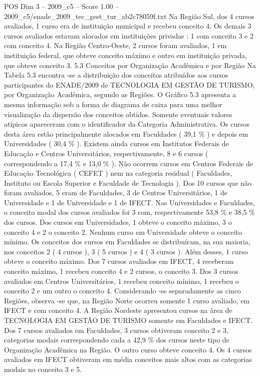 \begin{textsample}{POS Dim 3 – 2009\_c5 – Score 1.00 – 2009\_c5/enade\_2009\_tec\_gest\_tur\_ab2c78059f.txt}
Na Região Sul, dos 4 cursos avaliados, 1 curso era de instituição municipal e recebeu conceito 4.
Os demais 3 cursos avaliados estavam alocados em instituições privadas : 1 com conceito 3 e 2 com conceito 4.
Na Região Centro-Oeste, 2 cursos foram avaliados, 1 em instituição federal, que obteve conceito máximo e outro em instituição privada, que obteve conceito 3. 5.3 Conceitos por Organização Acadêmica e por Região Na Tabela 5.3 encontra -se a distribuição dos conceitos atribuídos aos cursos participantes do ENADE/2009 de TECNOLOGIA EM GESTÃO DE TURISMO, por Organização Acadêmica, segundo as Regiões.
O Gráfico 5.3 apresenta a mesma informação sob a forma de diagrama de caixa para uma melhor visualização da dispersão dos conceitos obtidos.
Somente eventuais valores atípicos apareceram com o identificador da Categoria Administrativa.
Os cursos desta área estão principalmente alocados em Faculdades ( 39,1 \% ) e depois em Universidades ( 30,4 \% ).
Existem ainda cursos em Institutos Federais de Educação e Centros Universitários, respectivamente, 8 e 6 cursos ( correspondendo a 17,4 \% e 13,0 \% ).
Não ocorrem cursos em Centros Federais de Educação Tecnológica ( CEFET ) nem na categoria residual ( Faculdades, Instituto ou Escola Superior e Faculdade de Tecnologia ).
Dos 10 cursos que não foram avaliados, 5 eram de Faculdades, 3 de Centros Universitários, 1 de Universidade e 1 de Universidade e 1 de IFECT.
Nas Universidades e Faculdades, o conceito modal dos cursos avaliados foi 3 com, respectivamente 53,8 \% e 38,5 \% dos cursos.
Dos cursos em Universidades, 1 obteve o conceito máximo, 3 o conceito 4 e 2 o conceito 2.
Nenhum curso em Universidade obteve o conceito mínimo.
Os conceitos dos cursos em Faculdades se distribuíram, na sua maioria, nos conceitos 2 ( 4 cursos ), 3 ( 5 cursos ) e 4 ( 3 cursos ).
Além desses, 1 curso obteve o conceito máximo.
Dos 7 cursos avaliados em IFECT, 4 receberam conceito máximo, 1 recebeu conceito 4 e 2 cursos, o conceito 3.
Dos 3 cursos avaliados em Centros Universitários, 1 recebeu conceito mínimo, 1 recebeu o conceito 2 e um outro o conceito 4.
Considerando -se separadamente as cinco Regiões, observa -se que, na Região Norte ocorreu somente 1 curso avaliado, em IFECT e com conceito 4.
A Região Nordeste apresentou cursos na área de TECNOLOGIA EM GESTÃO DE TURISMO somente em Faculdades e IFECT.
Dos 7 cursos avaliados em Faculdades, 3 cursos obtiveram conceito 2 e 3, categorias modais correspondendo cada a 42,9 \% dos cursos neste tipo de Organização Acadêmica na Região.
O outro curso obteve conceito 4.
Os 4 cursos avaliados em IFECT obtiveram em média conceitos mais altos com as categorias modais no conceito 3 e 5.

\end{textsample}
